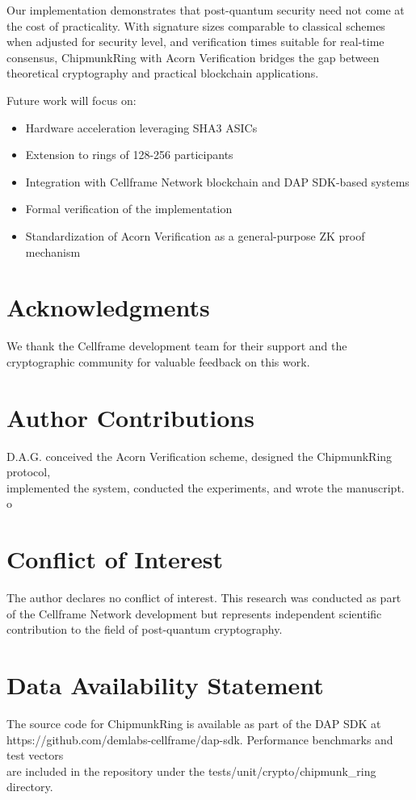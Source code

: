 \documentclass[11pt,a4paper]{article}
\begin{document}
Our implementation demonstrates that post-quantum security need not come at the cost of practicality. With signature sizes comparable to classical schemes when adjusted for security level, and verification times suitable for real-time consensus, ChipmunkRing with Acorn Verification bridges the gap between theoretical cryptography and practical blockchain applications.

Future work will focus on:
\begin{itemize}
\item Hardware acceleration leveraging SHA3 ASICs
\item Extension to rings of 128-256 participants
\item Integration with Cellframe Network blockchain and DAP SDK-based systems
\item Formal verification of the implementation
\item Standardization of Acorn Verification as a general-purpose ZK proof mechanism
\end{itemize}

\section{Acknowledgments}

We thank the Cellframe development team for their support and the cryptographic community for valuable feedback on this work.

\section*{Author Contributions}

D.A.G. conceived the Acorn Verification scheme, designed the ChipmunkRing protocol, \\
implemented the system, conducted the experiments, and wrote the manuscript.
o
\section*{Conflict of Interest}

The author declares no conflict of interest. This research was conducted as part of the Cellframe Network development but represents independent scientific contribution to the field of post-quantum cryptography.

\section*{Data Availability Statement}

The source code for ChipmunkRing is available as part of the DAP SDK at \\
https://github.com/demlabs-cellframe/dap-sdk. Performance benchmarks and test vectors \\
are included in the repository under the tests/unit/crypto/chipmunk\_ring directory.



\end{document}
